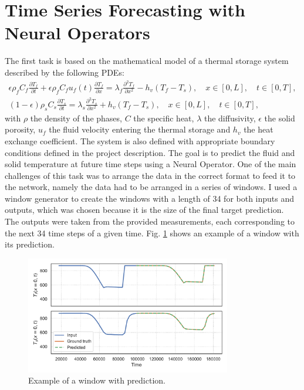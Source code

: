 \documentclass[unicode,11pt,a4paper,oneside,numbers=endperiod,openany]{scrartcl}
\begin{document}
\section{Time Series Forecasting with Neural Operators}\label{sec:task1}
The first task is based on the mathematical model of a thermal storage system
described by the following PDEs:
\begin{align}
    \epsilon \rho_f C_f \frac{\partial T_f}{\partial t} + \epsilon \rho_f C_f u_f(t) \frac{\partial T_f}{\partial x} = \lambda_f \frac{\partial^2 T_f}{\partial x^2} - h_v(T_f - T_s), \quad x \in [0, L], \quad t \in [0, T],
    \\
    (1-\epsilon)\rho_s C_s\frac{\partial T_s}{\partial t} = \lambda_s \frac{\partial^2 T_s}{\partial x^2} + h_v(T_f - T_s),  \quad x \in [0, L], \quad t \in [0, T],
\end{align}
with $\rho$ the density of the phases, $C$ the specific heat, $\lambda$ the diffusivity, $\epsilon$ the solid porosity, $u_f$
the fluid velocity entering the thermal storage and $h_v$ the heat exchange
coefficient.
The system is also defined with appropriate boundary conditions defined in the
project description.
The goal is to predict the fluid and solid temperature at future time steps
using a Neural Operator.
One of the main challenges of this task was to arrange the data in the correct
format to feed it to the network, namely the data had to be arranged in a
series of windows. I used a window generator to create the windows with a length
of 34 for both inputs and outputs, which was chosen because it is the size of the
final target prediction. 
The outputs were taken from the provided measurements, each  corresponding to the
next 34 time steps of a given time. Fig. \ref{fig:window} shows an example of a
window with its 
prediction.
\begin{figure}[ht!]
    \centering
    \includegraphics[width=0.8\textwidth]{../task1/fno/plot_window_5.pdf}
    \caption{Example of a window with prediction.}
    \label{fig:window}
\end{figure}
\end{document}

